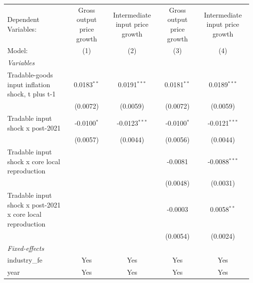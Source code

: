 \begingroup
\centering
\begin{tabular}{lcccc}
   \tabularnewline \midrule \midrule
   Dependent Variables:                                       & Gross output price growth & Intermediate input price growth & Gross output price growth & Intermediate input price growth\\  
   Model:                                                     & (1)                       & (2)                             & (3)                       & (4)\\  
   \midrule
   \emph{Variables}\\
   Tradable-goods input inflation shock, t plus t-1           & 0.0183$^{**}$             & 0.0191$^{***}$                  & 0.0181$^{**}$             & 0.0189$^{***}$\\   
                                                              & (0.0072)                  & (0.0059)                        & (0.0072)                  & (0.0059)\\   
   Tradable input shock x post-2021                           & -0.0100$^{*}$             & -0.0123$^{***}$                 & -0.0100$^{*}$             & -0.0121$^{***}$\\   
                                                              & (0.0057)                  & (0.0044)                        & (0.0056)                  & (0.0044)\\   
   Tradable input shock x core local reproduction             &                           &                                 & -0.0081                   & -0.0088$^{***}$\\   
                                                              &                           &                                 & (0.0048)                  & (0.0031)\\   
   Tradable input shock x post-2021 x core local reproduction &                           &                                 & -0.0003                   & 0.0058$^{**}$\\   
                                                              &                           &                                 & (0.0054)                  & (0.0024)\\   
   \midrule
   \emph{Fixed-effects}\\
   industry\_fe                                               & Yes                       & Yes                             & Yes                       & Yes\\  
   year                                                       & Yes                       & Yes                             & Yes                       & Yes\\  

\end{tabular}
